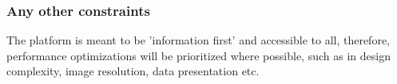 \subsubsection{Any other constraints}
The platform is meant to be 'information first' and accessible to all, therefore, performance optimizations will be prioritized where possible, such as in design complexity, image resolution, data presentation etc.
